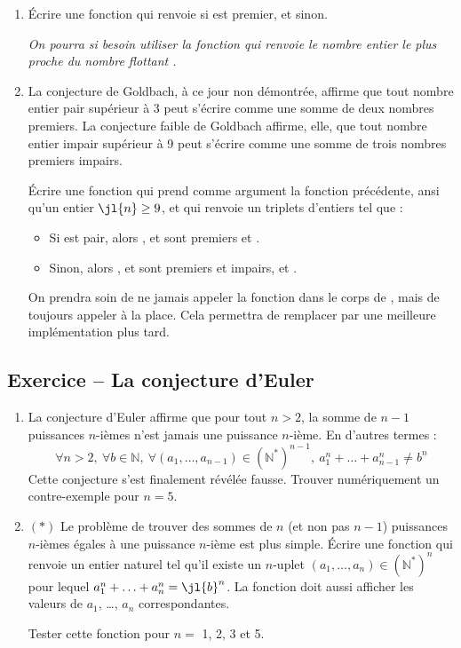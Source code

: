\documentclass{article}
\newcounter{loop}
\newcounter{numEx}
\newcommand{\exo}[1]{
	\stepcounter{numEx}
	\setcounter{loop}{0}
	\subsection*{Exercice \arabic{numEx} -- #1}
}
\newcommand{\paren}[1]{\ensuremath{\left(#1\right)}}
\newcommand{\N}{\mathbb{N}}
\begin{document}
\begin{enumerate}
	\item Écrire une fonction  qui renvoie  si  est premier, et  sinon.

	\textsl{On pourra si besoin utiliser la fonction  qui renvoie le nombre entier le plus proche du nombre flottant .}

	\item La conjecture de Goldbach, à ce jour non démontrée, affirme que tout nombre entier pair supérieur à 3 peut s’écrire comme une somme de deux nombres premiers. La conjecture faible de Goldbach affirme, elle, que tout nombre entier impair supérieur à 9 peut s'écrire comme une somme de trois nombres premiers impairs.

	Écrire une fonction  qui prend comme argument la fonction  précédente, ansi qu'un entier $\jl{n} \ge 9$, et qui renvoie un triplets d'entiers  tel que :
	\begin{itemize}
		\item Si  est pair, alors ,  et  sont premiers et .
		\item Sinon, alors ,  et  sont premiers et impairs, et .
	\end{itemize}

	On prendra soin de ne jamais appeler la fonction  dans le corps de , mais de toujours appeler  à la place. Cela permettra de remplacer  par une meilleure implémentation plus tard.
\end{enumerate}

\exo{La conjecture d'Euler}

\begin{enumerate}
	\item La conjecture d'Euler affirme que pour tout $n>2$, la somme de $n-1$ puissances $n$-ièmes n'est jamais une puissance $n$-ième. En d'autres termes :\vspace{-0.5em}
	\[\forall n>2,\ \forall b\in\N,\ \forall (a_1, \ldots, a_{n-1})\in\paren{\N^*}^{n-1},\ a_1^n + \ldots + a_{n-1}^n \neq b^n\]
	Cette conjecture s'est finalement révélée fausse. Trouver numériquement un contre-exemple pour $n = 5$.

	\item $(*)$ Le problème de trouver des sommes de $n$ (et non pas $n-1$) puissances $n$-ièmes égales à une puissance $n$-ième est plus simple. Écrire une fonction  qui renvoie un entier naturel  tel qu'il existe un $n$-uplet $(a_1, \ldots, a_n)\in\paren{\N^*}^n$ pour lequel $a_1^n + \ldots + a_n^n = \jl{b}^n$. La fonction doit aussi afficher les valeurs de $a_1$, \ldots, $a_n$ correspondantes.

	Tester cette fonction pour $n = $ 1, 2, 3 et 5.
\end{enumerate}
\end{document}
